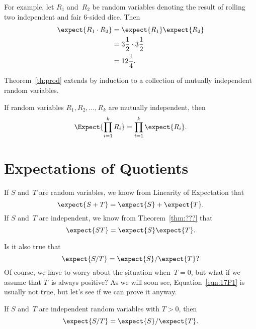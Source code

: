 For example, let $R_1$ and~$R_2$ be random variables denoting the
result of rolling two independent and fair 6-sided dice.  Then
\begin{align*}
\expect{R_1 \cdot R_2}
    &= \expect{R_1} \expect{R_2} \\
    &= 3\frac{1}{2} \cdot 3\frac{1}{2} \\
    &= 12\frac{1}{4}.
\end{align*}

Theorem~\ref{th:prod} extends by induction to a collection of mutually
independent random variables.
\begin{corollary}
If random variables $R_1, R_2, \dots, R_k$ are mutually
independent, then
\[
    \Expect{\prod_{i=1}^k R_i} = \prod_{i=1}^k \expect{R_i}.
\]
\end{corollary}

\section{Expectations of Quotients}

If $S$ and~$T$ are random variables, we know from Linearity of
Expectation that
\begin{equation*}
    \expect{S + T} = \expect{S} + \expect{T}.
\end{equation*}
If $S$ and~$T$ are independent, we know from Theorem~\ref{thm:???}
that
\begin{equation*}
    \expect{ST} = \expect{S} \expect{T}.
\end{equation*}

Is it also true that
\begin{equation}\label{eqn:17P1}
    \expect{S/T} = \expect{S}/\expect{T}?
\end{equation}
Of course, we have to worry about the situation when~$T = 0$, but what
if we assume that $T$~is always positive?  As we will soon see,
Equation~\ref{eqn:17P1} is usually not true, but let's see if we can
prove it anyway.

\begin{falseclm}\label{fc:17P2}
If $S$ and~$T$ are independent random variables with $T > 0$, then
\begin{equation}
    \expect{S/T} = \expect{S}/\expect{T}.
\end{equation}
\end{falseclm}

